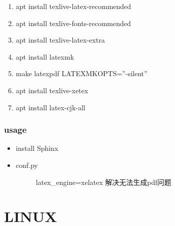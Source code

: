 \documentclass[a4paper,10pt,english]{sphinxmanual}
\begin{document}
\begin{enumerate}
\item {} 
apt install texlive-latex-recommended

\item {} 
apt install texlive-fonts-recommended

\item {} 
apt install texlive-latex-extra

\item {} 
apt install latexmk

\item {} 
make latexpdf LATEXMKOPTS=”-silent”

\item {} 
apt install texlive-xetex

\item {} 
apt install latex-cjk-all

\end{enumerate}


\subsection{usage}
\label{\detokenize{intro:usage}}\begin{itemize}
\item {} 
install Sphinx

\begin{sphinxVerbatim}[commandchars=\\\{\}]
   
   
    
    
 
\end{sphinxVerbatim}

\item {} \begin{description}
\item[{conf.py}] \leavevmode
latex\_engine=xelatex 解决无法生成pdf问题

\end{description}

\end{itemize}


\chapter{LINUX}
\label{\detokenize{linux/index::doc}}\label{\detokenize{linux/index:linux}}
\end{document}
